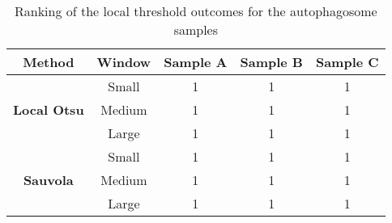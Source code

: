 \begin{table}[h!]
    \centering
    \begin{tabular}{ccccc}
    \hline
    \textbf{Method} & \textbf{Window} & \textbf{Sample A} & \textbf{Sample B} & \textbf{Sample C} \\ \hline
    \multirow{3}{*}{\textbf{Local Otsu}} & Small & 1 & 1 & 1 \\
    & Medium & 1 & 1 & 1 \\ & Large & 1 & 1 & 1 \\ \hline
    \multirow{3}{*}{\textbf{Sauvola}} & Small & 1 & 1 & 1 \\
    & Medium & 1 & 1 & 1 \\ & Large & 1 & 1 & 1 \\ \hline
    \end{tabular}
    \caption{Ranking of the local threshold outcomes for the autophagosome samples}
    \label{tab:local_auto_rankings}
\end{table}

